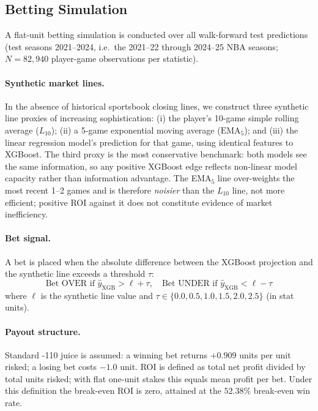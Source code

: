 \documentclass[12pt, letterpaper]{article}
\begin{document}
\subsection{Betting Simulation}
\label{subsec:sim}

A flat-unit betting simulation is conducted over all walk-forward
test predictions (test seasons 2021--2024, i.e.\ the 2021--22 through
2024--25 NBA seasons; $N = 82{,}940$ player-game observations per
statistic).

\paragraph{Synthetic market lines.}
In the absence of historical sportsbook closing lines, we construct
three synthetic line proxies of increasing sophistication:
(i) the player's 10-game simple rolling average ($L_{10}$);
(ii) a 5-game exponential moving average ($\text{EMA}_5$);
and (iii) the linear regression model's prediction for that game,
using identical features to XGBoost.
The third proxy is the most conservative benchmark: both models see
the same information, so any positive XGBoost edge reflects
non-linear model capacity rather than information advantage.
The EMA$_5$ line over-weights the most recent 1--2 games and is
therefore \textit{noisier} than the $L_{10}$ line, not more efficient;
positive ROI against it does not constitute evidence of market
inefficiency.

\paragraph{Bet signal.}
A bet is placed when the absolute difference between the XGBoost
projection and the synthetic line exceeds a threshold $\tau$:
\begin{equation}
    \text{Bet OVER if } \hat{y}_{\text{XGB}} > \ell + \tau, \quad
    \text{Bet UNDER if } \hat{y}_{\text{XGB}} < \ell - \tau
    \label{eq:betsignal}
\end{equation}
where $\ell$ is the synthetic line value and $\tau \in \{0.0, 0.5,
1.0, 1.5, 2.0, 2.5\}$ (in stat units).

\paragraph{Payout structure.}
Standard -110 juice is assumed: a winning bet returns $+0.909$ units
per unit risked; a losing bet costs $-1.0$ unit.
ROI is defined as total net profit divided by total units risked; with
flat one-unit stakes this equals mean profit per bet.
Under this definition the break-even ROI is zero, attained at the
$52.38\%$ break-even win rate.
\end{document}
